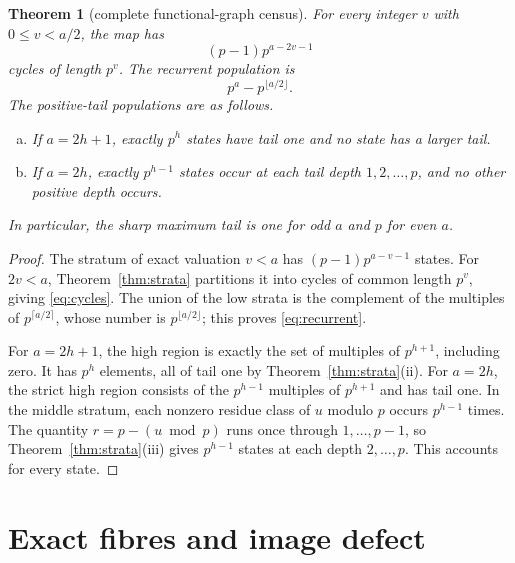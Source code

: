 \documentclass[a4paper,10pt]{amsart}
\newtheorem{theorem}{Theorem}[section]
\theoremstyle{remark}
\begin{document}
\begin{theorem}[complete functional-graph census]\label{thm:census}
For every integer $v$ with $0\leq v<a/2$, the map has
\begin{equation}\label{eq:cycles}
 (p-1)p^{a-2v-1}
\end{equation}
cycles of length $p^v$.  The recurrent population is
\begin{equation}\label{eq:recurrent}
 p^a-p^{\lfloor a/2\rfloor}.
\end{equation}
The positive-tail populations are as follows.
\begin{enumerate}[(a)]
\item If $a=2h+1$, exactly $p^h$ states have tail one and no state has a
      larger tail.
\item If $a=2h$, exactly $p^{h-1}$ states occur at each tail depth
      $1,2,\ldots,p$, and no other positive depth occurs.
\end{enumerate}
In particular, the sharp maximum tail is one for odd $a$ and $p$ for even
$a$.
\end{theorem}

\begin{proof}
The stratum of exact valuation $v<a$ has
$(p-1)p^{a-v-1}$ states.  For $2v<a$, Theorem~\ref{thm:strata} partitions it
into cycles of common length $p^v$, giving \eqref{eq:cycles}.  The union of
the low strata is the complement of the multiples of
$p^{\lceil a/2\rceil}$, whose number is $p^{\lfloor a/2\rfloor}$; this proves
\eqref{eq:recurrent}.

For $a=2h+1$, the high region is exactly the set of multiples of $p^{h+1}$,
including zero.  It has $p^h$ elements, all of tail one by
Theorem~\ref{thm:strata}(ii).  For $a=2h$, the strict high region consists of
the $p^{h-1}$ multiples of $p^{h+1}$ and has tail one.  In the middle stratum,
each nonzero residue class of $u$ modulo $p$ occurs $p^{h-1}$ times.  The
quantity $r=p-(u\bmod p)$ runs once through $1,\ldots,p-1$, so
Theorem~\ref{thm:strata}(iii) gives $p^{h-1}$ states at each depth
$2,\ldots,p$.  This accounts for every state.
\end{proof}

\section{Exact fibres and image defect}
\end{document}
